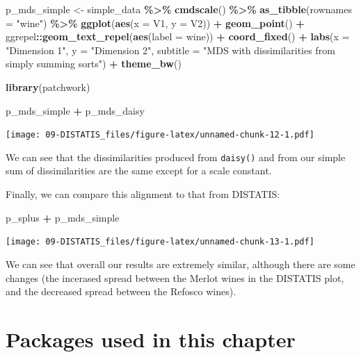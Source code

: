 \documentclass[
]{book}
\newenvironment{Shaded}{\begin{snugshade}}{\end{snugshade}}
\newcommand{\AttributeTok}[1]{\textcolor[rgb]{0.13,0.29,0.53}{#1}}
\newcommand{\FunctionTok}[1]{\textcolor[rgb]{0.13,0.29,0.53}{\textbf{#1}}}
\newcommand{\NormalTok}[1]{#1}
\newcommand{\OtherTok}[1]{\textcolor[rgb]{0.56,0.35,0.01}{#1}}
\newcommand{\SpecialCharTok}[1]{\textcolor[rgb]{0.81,0.36,0.00}{\textbf{#1}}}
\newcommand{\StringTok}[1]{\textcolor[rgb]{0.31,0.60,0.02}{#1}}
\begin{document}
\begin{Shaded}
\begin{Highlighting}[]
\NormalTok{p\_mds\_simple }\OtherTok{\textless{}{-}} 
\NormalTok{  simple\_data }\SpecialCharTok{\%\textgreater{}\%}
  \FunctionTok{cmdscale}\NormalTok{() }\SpecialCharTok{\%\textgreater{}\%}
  \FunctionTok{as\_tibble}\NormalTok{(}\AttributeTok{rownames =} \StringTok{"wine"}\NormalTok{) }\SpecialCharTok{\%\textgreater{}\%}
  \FunctionTok{ggplot}\NormalTok{(}\FunctionTok{aes}\NormalTok{(}\AttributeTok{x =}\NormalTok{ V1, }\AttributeTok{y =}\NormalTok{ V2)) }\SpecialCharTok{+} 
  \FunctionTok{geom\_point}\NormalTok{() }\SpecialCharTok{+} 
\NormalTok{  ggrepel}\SpecialCharTok{::}\FunctionTok{geom\_text\_repel}\NormalTok{(}\FunctionTok{aes}\NormalTok{(}\AttributeTok{label =}\NormalTok{ wine)) }\SpecialCharTok{+} 
  \FunctionTok{coord\_fixed}\NormalTok{() }\SpecialCharTok{+} 
  \FunctionTok{labs}\NormalTok{(}\AttributeTok{x =} \StringTok{"Dimension 1"}\NormalTok{, }\AttributeTok{y =} \StringTok{"Dimension 2"}\NormalTok{,}
       \AttributeTok{subtitle =} \StringTok{"MDS with dissimilarities from simply summing sorts"}\NormalTok{) }\SpecialCharTok{+} 
  \FunctionTok{theme\_bw}\NormalTok{()}

\FunctionTok{library}\NormalTok{(patchwork)}

\NormalTok{p\_mds\_simple }\SpecialCharTok{+}\NormalTok{ p\_mds\_daisy}
\end{Highlighting}
\end{Shaded}

\texttt{[image: 09-DISTATIS\_files/figure-latex/unnamed-chunk-12-1.pdf]}

We can see that the dissimilarities produced from \texttt{daisy()} and from our simple sum of dissimilarities are the same except for a scale constant.

Finally, we can compare this alignment to that from DISTATIS:

\begin{Shaded}
\begin{Highlighting}[]
\NormalTok{p\_splus }\SpecialCharTok{+}\NormalTok{ p\_mds\_simple}
\end{Highlighting}
\end{Shaded}

\texttt{[image: 09-DISTATIS\_files/figure-latex/unnamed-chunk-13-1.pdf]}

We can see that overall our results are extremely similar, although there are some changes (the incerased spread between the Merlot wines in the DISTATIS plot, and the decreased spread between the Refosco wines).

\section{Packages used in this chapter}\label{packages-used-in-this-chapter-8}
\end{document}
